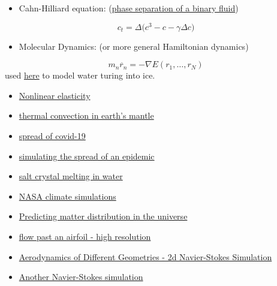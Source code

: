 \documentclass[12pt,landscape]{article}
\begin{document}
{\begin{itemize}
\item Cahn-Hilliard equation: (\href{https://www.youtube.com/watch?v=MovUu2DwWvI}{phase separation of a binary fluid})

\end{itemize}
\[
c_t = \Delta \big( c^3 - c - \gamma \Delta c \big)
\]
\begin{itemize}
\item Molecular Dynamics: (or more general Hamiltonian dynamics)

\end{itemize}
\[
m_n \ddot{r_n} = - \nabla E(r_1, \dots, r_N)
\]
used \href{https://www.youtube.com/watch?v=zRUFzJrDtq0}{here} to model water turing into ice.

\begin{itemize}
\item \href{https://www.youtube.com/watch?v=u8Kfn2o7epQ}{Nonlinear elasticity}


\item \href{https://www.youtube.com/watch?v=-kDb0HlDsIM}{thermal convection in earth's mantle}


\item \href{https://www.youtube.com/watch?v=dbBmSBA7Kyw}{spread of covid-19}


\item \href{https://www.youtube.com/watch?v=gxAaO2rsdIs}{simulating the spread of an epidemic}


\item \href{https://www.youtube.com/watch?v=_0QhOCDzP4I&t}{salt crystal melting in water}


\item \href{https://www.youtube.com/watch?v=jj0WsQYtT7M}{NASA climate simulations}


\item \href{https://www.youtube.com/watch?v=rtBlZJ6gNiI}{Predicting matter distribution in the universe}


\item \href{https://www.youtube.com/watch?v=hz7UjN_vYuw}{flow past an airfoil - high resolution}


\item \href{https://www.youtube.com/watch?v=bJX8fVsq5oQ}{Aerodynamics of Different Geometries - 2d Navier-Stokes Simulation}


\item \href{https://www.youtube.com/watch?v=vOFcHqImXJ8}{Another Navier-Stokes simulation}


\end{itemize}}
\end{document}
